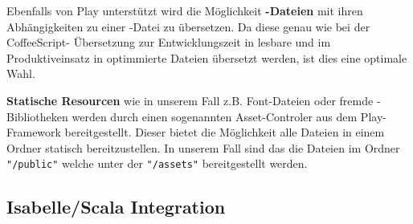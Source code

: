 Ebenfalls von Play unterstützt wird die Möglichkeit  \textbf{-Dateien} mit ihren
Abhängigkeiten zu einer -Datei zu übersetzen. Da diese genau wie bei der CoffeeScript-
Übersetzung zur Entwicklungszeit in lesbare und im Produktiveinsatz in optimmierte Dateien übersetzt
werden, ist dies eine optimale Wahl.

\textbf{Statische Resourcen} wie in unserem Fall z.B. Font-Dateien oder fremde -Bibliotheken
werden durch einen sogenannten Asset-Controler aus dem Play-Framework bereitgestellt. Dieser bietet
die Möglichkeit alle Dateien in einem Ordner statisch bereitzustellen. In unserem Fall sind das die
Dateien im Ordner \texttt{"/public"} welche unter der  \texttt{"/assets"} bereitgestellt
werden.

\subsection{Isabelle/Scala Integration}


